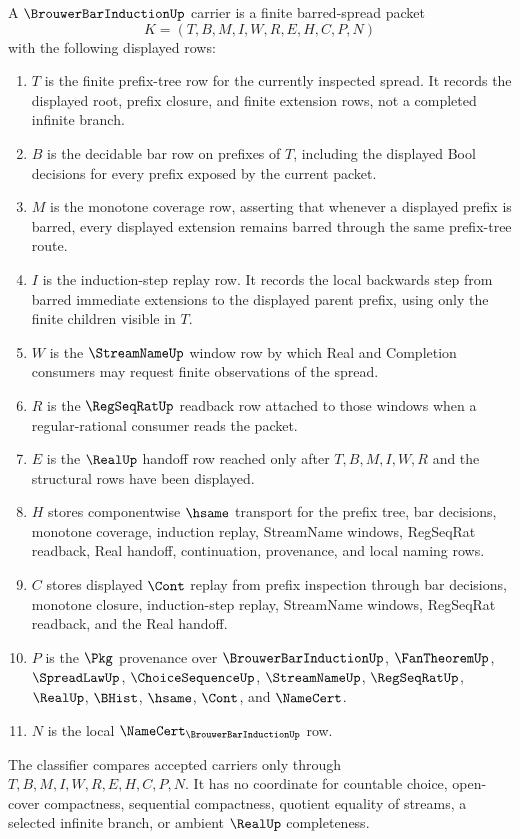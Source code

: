 \begin{definition}
\label{def:brouwer-bar-induction-carrier}
A $\BrouwerBarInductionUp$ carrier is a finite barred-spread packet
$$
K=(T,B,M,I,W,R,E,H,C,P,N)
$$
with the following displayed rows:
\begin{enumerate}
\item $T$ is the finite prefix-tree row for the currently inspected spread. It records the displayed root, prefix closure, and finite extension rows, not a completed infinite branch.
\item $B$ is the decidable bar row on prefixes of $T$, including the displayed Bool decisions for every prefix exposed by the current packet.
\item $M$ is the monotone coverage row, asserting that whenever a displayed prefix is barred, every displayed extension remains barred through the same prefix-tree route.
\item $I$ is the induction-step replay row. It records the local backwards step from barred immediate extensions to the displayed parent prefix, using only the finite children visible in $T$.
\item $W$ is the $\StreamNameUp$ window row by which Real and Completion consumers may request finite observations of the spread.
\item $R$ is the $\RegSeqRatUp$ readback row attached to those windows when a regular-rational consumer reads the packet.
\item $E$ is the $\RealUp$ handoff row reached only after $T,B,M,I,W,R$ and the structural rows have been displayed.
\item $H$ stores componentwise $\hsame$ transport for the prefix tree, bar decisions, monotone coverage, induction replay, StreamName windows, RegSeqRat readback, Real handoff, continuation, provenance, and local naming rows.
\item $C$ stores displayed $\Cont$ replay from prefix inspection through bar decisions, monotone closure, induction-step replay, StreamName windows, RegSeqRat readback, and the Real handoff.
\item $P$ is the $\Pkg$ provenance over $\BrouwerBarInductionUp$, $\FanTheoremUp$, $\SpreadLawUp$, $\ChoiceSequenceUp$, $\StreamNameUp$, $\RegSeqRatUp$, $\RealUp$, $\BHist$, $\hsame$, $\Cont$, and $\NameCert$.
\item $N$ is the local $\NameCert_{\BrouwerBarInductionUp}$ row.
\end{enumerate}
The classifier compares accepted carriers only through $T,B,M,I,W,R,E,H,C,P,N$. It has no coordinate for countable choice, open-cover compactness, sequential compactness, quotient equality of streams, a selected infinite branch, or ambient $\RealUp$ completeness.
\end{definition}

